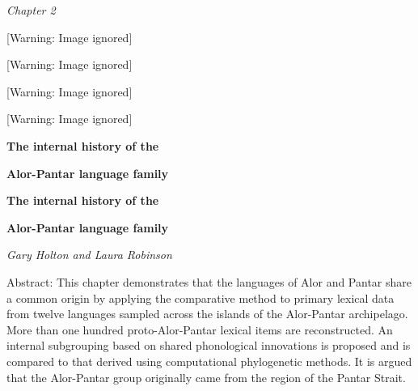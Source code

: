 
\clearpage\setcounter{page}{1}\pagestyle{Standard}
{\centering
\textit{Chapter 2}
\par}

\begin{center}
 [Warning: Image ignored] %

\end{center}
\begin{center}
 [Warning: Image ignored] %

\end{center}
\begin{center}
 [Warning: Image ignored] %

\end{center}
\begin{center}
 [Warning: Image ignored] %

\end{center}
{\centering
\textbf{The internal history of the }
\par}

{\centering
\textbf{Alor-Pantar language family}
\par}

\setcounter{tocdepth}{3}
\renewcommand\contentsname{}
\tableofcontents
{}

{\centering
\textbf{The internal history of the }
\par}

{\centering
\textbf{Alor-Pantar language family}
\par}

{\centering
\textit{Gary Holton and Laura Robinson}
\par}

Abstract: This chapter demonstrates that the languages of Alor and Pantar share a common origin by applying the comparative method to primary lexical data from twelve languages sampled across the islands of the Alor-Pantar archipelago. More than one hundred proto-Alor-Pantar lexical items are reconstructed. An internal subgrouping based on shared phonological innovations is proposed and is compared to that derived using computational phylogenetic methods. It is argued that the Alor-Pantar group originally came from the region of the Pantar Strait.

